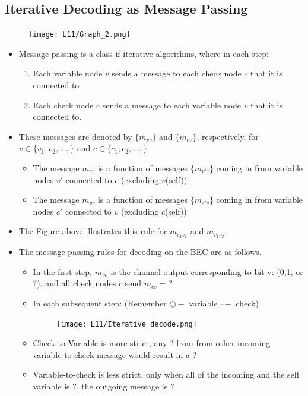 \documentclass[12pt]{article}
\begin{document}
\subsection{Iterative Decoding as Message Passing}
\begin{figure}[H]
    \centering
    \texttt{[image: L11/Graph\_2.png]}
\end{figure}
\begin{itemize}
    \item Message passing is a class if iterative algorithms, where in each step:
    \begin{enumerate}[label=\arabic*)]
        \item Each variable node $v$ sends a message to each check node $c$ that it is connected to
        \item Each check node c sends a message to each variable node $v$ that it is connected to.
    \end{enumerate}
    \item These messages are denoted by $\{m_{v c}\}$ and $\{m_{c v}\}$, respectively, for $v\in\{v_1,v_2,..., \}$ and $c\in\{c_1,c_2,..., \}$
    \begin{itemize}
        \item The message $m_{c v}$ is a function of messages $\{m_{v' c}\}$ coming in from variable nodes $v'$ connected to $c$ (excluding $v$(self))
        \item The message $m_{v c}$ is a function of messages $\{m_{c' v}\}$ coming in from variable nodes $c'$ connected to $v$ (excluding $c$(self))
    \end{itemize}
    \item The Figure above illustrates this rule for $m_{c_1 v_1}$ and $m_{v_1 c_2}$.
    \item The message passing rules for decoding on the BEC are as follows.
    \begin{itemize}
        \item In the first step, $m_{v c }$ is the channel output corresponding to bit v: (0,1, or ?), and all check nodes $c$ send $m_{c v} = $?
        \item In each subsequent step: (Remember $\bigcirc -$ variable $\square -$ check)
        \begin{figure}[H]
            \centering
            \texttt{[image: L11/Iterative\_decode.png]}
        \end{figure}
        \item Check-to-Variable is more strict, any ? from from other incoming variable-to-check message would result in a ?
        \item Variable-to-check is less strict, only when all of the incoming and the self variable is ?, the outgoing message is ?
    \end{itemize}
        

\end{itemize}
\end{document}

